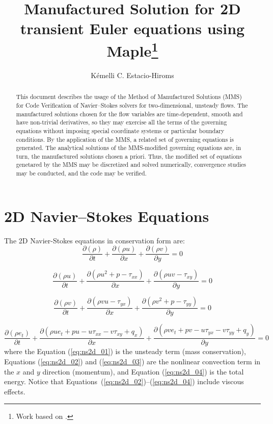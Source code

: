 \documentclass[10pt]{article}
\title{Manufactured Solution for 2D transient Euler equations using Maple\footnote{Work based on \citet*{Salari_Knupp_2000}.}}
\author{Kémelli C. Estacio-Hiroms}
\newcommand{\Diff}[2] {\dfrac{\partial( #1)}{\partial #2}}
\begin{document}
\maketitle

\begin{abstract}
This document describes the usage of the Method of Manufactured Solutions (MMS) for Code Verification of Navier--Stokes solvers for two-dimensional, unsteady flows. The manufactured solutions chosen for the flow variables are time-dependent, smooth and have non-trivial derivatives, so they may exercise all the terms of the governing equations without imposing special coordinate systems or particular
boundary conditions. By the application of the MMS, a related set of governing equations is generated. The analytical solutions of the MMS-modified governing equations are, in turn, the manufactured solutions chosen a priori. %
Thus, the modified set of equations genetared by the MMS may be discretized and solved numerically, convergence studies may be conducted, and the code may be verified.
\end{abstract}


\section{2D Navier--Stokes Equations}
The 2D Navier-Stokes equations in conservation form are:
\begin{equation}
 \label{eq:ns2d_01}
\Diff{\rho}{t} + \Diff{\rho u}{x}+\Diff{\rho v}{y} = 0
\end{equation}


\begin{equation}
 \label{eq:ns2d_02}
\Diff{\rho u}{t} + \Diff{\rho u^2 + p - \tau_{xx}}{x}+\Diff{\rho uv-\tau_{xy}}{y} = 0
\end{equation}


\begin{equation}
 \label{eq:ns2d_03}
\Diff{\rho v}{t} + \Diff{\rho vu - \tau_{yx}}{x}+\Diff{\rho v^2+p-\tau_{yy}}{y} = 0
\end{equation}


\begin{equation}
 \label{eq:ns2d_04}
\Diff{\rho e_t}{t} + \Diff{\rho ue_t +pu -u \tau_{xx}- v\tau_{xy} +q_x}{x}+\Diff{\rho ve_t +pv- u \tau_{yx} -v \tau_{yy} + q_y}{y} = 0
\end{equation}
%
where the Equation (\ref{eq:ns2d_01}) is the unsteady term (mass conservation), Equations (\ref{eq:ns2d_02}) and (\ref{eq:ns2d_03}) are the nonlinear convection term in the $x$ and $y$ direction (momentum), and Equation (\ref{eq:ns2d_04}) is the total energy. Notice that Equations~(\ref{eq:ns2d_02})--(\ref{eq:ns2d_04}) include viscous effects.
\end{document}
